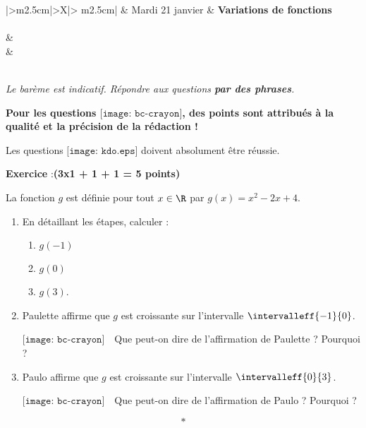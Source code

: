 \documentclass[10pt,french]{book}
\newcounter{exoc}
\newenvironment{exoc}[1]{%
  \refstepcounter{exoc}\textbf{Exercice \theexoc} :\hfill {\textbf{(#1)}}\par
  \medskip}%
{\medskip}
\newcommand\Kdo[1][1em]{$\texttt{[image: kdo.eps]}\hspace{#1}$}
\newcommand\Red[1][1em]{$\texttt{[image: bc-crayon]}\hspace{#1}$}
\begin{document}
\begin{center}
\begin{tabularx}{\textwidth}{|>\centering m{2.5cm}|>\centering X|>{\centering\arraybackslash} m{2.5cm}|}
	\hline
		 &  Mardi 21 janvier  & \textbf{Variations de fonctions} \\
	\hline
		 \\
	\hline
         &  \\
		 &  \\
	\hline
         \\[1cm]
    \hline
\end{tabularx}\medskip

{\itshape
\small
Le barème est indicatif. Répondre aux questions \textbf{par des phrases}.\par
{\bfseries Pour les questions \Red[0pt], des points sont attribués à la qualité et la précision de la rédaction !}\par
Les questions \Kdo[0pt] doivent absolument être réussie.
}
\end{center}



\begin{exoc}{3x1 + 1 + 1 = 5 points}
La fonction $g$ est définie pour tout $x \in \R$ par $g(x) = x^2 - 2x + 4.$

\begin{enumerate}
    \item En détaillant les étapes, calculer :
    \begin{enumerate}
        \item $g(-1)$
        \item $g(0)$
        \item $g(3)$.
    \end{enumerate}
    \item Paulette affirme que $g$ est croissante sur l'intervalle $\intervalleff{-1}{0}$.\par \Red Que peut-on dire de l'affirmation de Paulette ? Pourquoi ?
    \item Paulo affirme que $g$ est croissante sur l'intervalle $\intervalleff{0}{3}$.\par \Red Que peut-on dire de l'affirmation de Paulo ? Pourquoi ?
\end{enumerate}

\end{exoc}\[*\]
\end{document}
